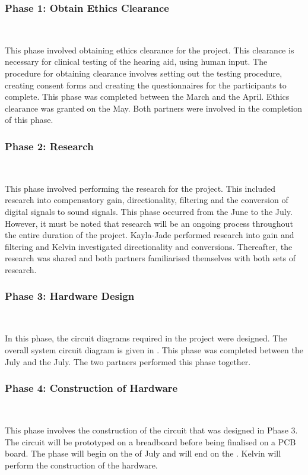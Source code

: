 \documentclass[10pt,twocolumn]{witseiepaper}
\begin{document}
\subsubsection*{Phase 1: Obtain Ethics Clearance} $    $

This phase involved obtaining ethics clearance for the project. This clearance is necessary for clinical testing of the hearing aid, using human input. The procedure for obtaining clearance involves setting out the testing procedure, creating consent forms and creating the questionnaires for the participants to complete. This phase was completed between the  March and the  April. Ethics clearance was granted on the  May. Both partners were involved in the completion of this phase.

\subsubsection*{Phase 2: Research} $    $

This phase involved performing the research for the project. This included research into compensatory gain, directionality, filtering and the conversion of digital signals to sound signals. This phase occurred from the  June to the  July. However, it must be noted that research will be an ongoing process throughout the entire duration of the project. Kayla-Jade performed research into gain and filtering and Kelvin investigated directionality and conversions. Thereafter, the research was shared and both partners familiarised themselves with both sets of research.

\subsubsection*{Phase 3: Hardware Design } $    $

In this phase, the circuit diagrams required in the project were designed. The overall system circuit diagram is given in . This phase was completed between the  July and the  July. The two partners performed this phase together.

\subsubsection*{Phase 4: Construction of Hardware } $    $

This phase involves the construction of the circuit that was designed in Phase 3. The circuit will be prototyped on a breadboard before being finalised on a PCB board. The phase will begin on the  of July and will end on the . Kelvin will perform the construction of the hardware.
\end{document}
